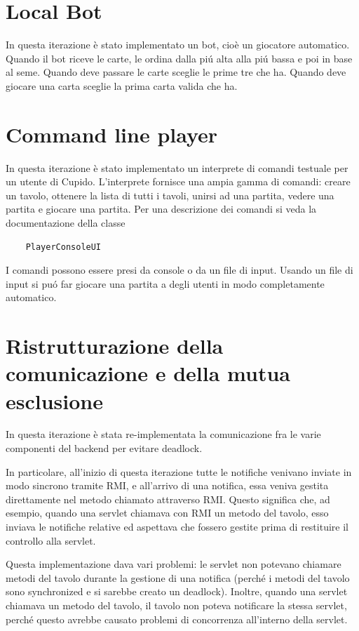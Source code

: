 \section{Local Bot}
  In questa iterazione \`e stato implementato un bot, cio\`e un giocatore automatico. Quando il bot riceve le carte, le ordina dalla pi\'u alta alla pi\'u bassa e poi in base al seme. Quando deve passare le carte sceglie le prime tre che ha. Quando deve giocare una carta sceglie la prima carta valida che ha.

\section{Command line player}
  In questa iterazione \`e stato implementato un interprete di comandi testuale per un utente di Cupido. L'interprete fornisce una ampia gamma di comandi: creare un tavolo, ottenere la lista di tutti i tavoli, unirsi ad una partita, vedere una partita e giocare una partita. Per una descrizione dei comandi si veda la documentazione della classe
  \begin{verbatim}
    PlayerConsoleUI
  \end{verbatim}
  I comandi possono essere presi da console o da un file di input. Usando un file di input si pu\'o far giocare una partita a degli utenti in modo completamente automatico.

\section{Ristrutturazione della comunicazione e della mutua esclusione}
  In questa iterazione \`e stata re-implementata la comunicazione fra le varie
  componenti del backend per evitare deadlock.

  In particolare, all'inizio di questa iterazione tutte le notifiche venivano
  inviate in modo sincrono tramite RMI, e all'arrivo di una notifica, essa
  veniva gestita direttamente nel metodo chiamato attraverso RMI. Questo
  significa che, ad esempio, quando una servlet chiamava con RMI un metodo
  del tavolo, esso inviava le notifiche relative ed aspettava che fossero
  gestite prima di restituire il controllo alla servlet.

  Questa implementazione dava vari problemi: le servlet non potevano chiamare
  metodi del tavolo durante la gestione di una notifica (perch\'e i metodi
  del tavolo sono synchronized e si sarebbe creato un deadlock).
  Inoltre, quando una servlet chiamava un metodo del tavolo, il tavolo non
  poteva notificare la stessa servlet, perch\'e questo avrebbe causato
  problemi di concorrenza all'interno della servlet.

